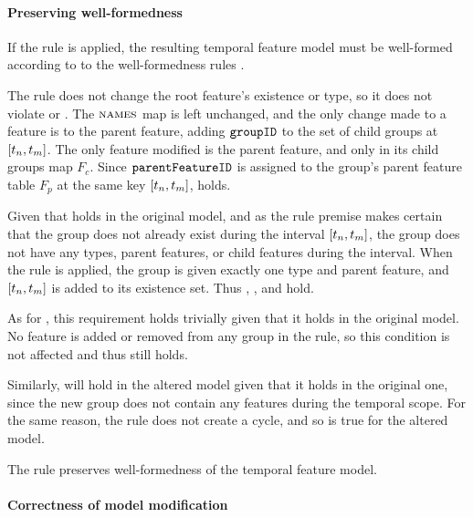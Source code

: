 \paragraph{Preserving well-formedness}

If the  rule is applied, the resulting temporal feature model must be well-formed according to to the well-formedness rules . 

The rule does not change the root feature's existence or type, so it does not violate  or . The $\textsc{names}{}$ map is left unchanged, and the only change made to a feature is to the parent feature, adding $\texttt{groupID}$ to the set of child groups at $\interval{t_n}{t_m}$. The only feature modified is the parent feature, and only in its child groups map $F_c$. Since $\texttt{parentFeatureID}$ is assigned to the group's parent feature table $F_p$ at the same key $\interval{t_n}{t_m}$,  holds.

Given that  holds in the original model, and as the rule premise makes certain that the group does not already exist during the interval $\interval{t_n}{t_m}$, the group does not have any types, parent features, or child features during the interval. When the rule is applied, the group is given exactly one type and parent feature, and $\interval{t_n}{t_m}$ is added to its existence set. Thus , , and  hold. 

As for , this requirement holds trivially given that it holds in the original model. No feature is added or removed from any group in the  rule, so this condition is not affected and thus still holds.

Similarly,  will hold in the altered model given that it holds in the original one, since the new group does not contain any features during the temporal scope. For the same reason, the rule does not create a cycle, and so  is true for the altered model.
\\

\begin{lemma}
   The  rule preserves well-formedness of the temporal feature model.
   \label{lemma:add-group-well-formed}
\end{lemma}

\paragraph{Correctness of model modification}

